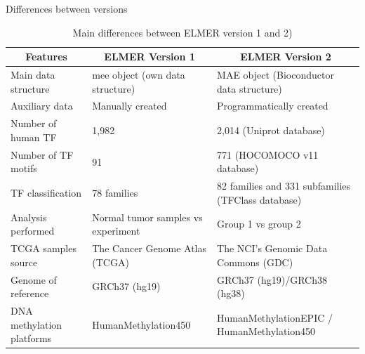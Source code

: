 \documentclass[slidestop,compress,11pt,xcolor=dvipsnames]{beamer}
\begin{document}
\begin{frame}{Differences between versions}
 \tiny{
  \begin{table}[h!]
   \centering
   \caption{Main differences between ELMER version 1 and 2)}
   \label{tab:summary}
   \begin{tabular}{@{}p{2.5cm}p{3.5cm}p{4cm}@{}}
    \toprule
    \multicolumn{1}{c}{\textbf{Features}} & \multicolumn{1}{c}{\textbf{ELMER Version 1}} & \multicolumn{1}{c}{\textbf{ELMER Version 2}}               \\ \midrule
    Main data structure                   & mee object (own data structure)              & MAE object (Bioconductor data structure)                   \\
    Auxiliary data                        & Manually created                             & Programmatically created                                   \\
    Number of human TF                    & 1,982                                        & 2,014 (Uniprot database)                                    \\
    Number of TF motifs                   & 91                                           & 771  (HOCOMOCO v11 database)                               \\
    TF classification                     & 78 families                                  & 82 families and 331 subfamilies \newline(TFClass database) \\
    Analysis performed                    & Normal tumor samples vs experiment           & Group 1 vs group 2                                         \\
    TCGA samples source                   & The Cancer Genome Atlas (TCGA)               & The NCI's Genomic Data Commons (GDC)                       \\
    Genome of reference                   & GRCh37 (hg19)                                & GRCh37 (hg19)/GRCh38 (hg38)                                \\
    DNA methylation platforms             & HumanMethylation450                          & HumanMethylationEPIC / HumanMethylation450                 \\
    \bottomrule
   \end{tabular}
  \end{table}
 }
\end{frame}
\end{document}
